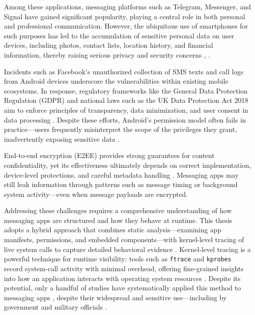\documentclass[a4paper,12pt]{report}
\begin{document}
Among these applications, messaging platforms such as Telegram, Messenger, and Signal have gained significant popularity, playing a
central role in both personal and professional communication. However, the
ubiquitous use of smartphones for such purposes has led to the accumulation of
sensitive personal data on user devices, including photos, contact lists,
location history, and financial information, thereby raising serious privacy and
security concerns \cite{ArsTechnica2018}, \cite{ShenVervierStringhini2021}.

Incidents such as Facebook’s unauthorized collection of SMS texts and call logs
from Android devices \cite{ArsTechnica2018} underscore the vulnerabilities
within existing mobile ecosystems. In response, regulatory frameworks like the
General Data Protection Regulation (GDPR) and national laws such as the UK Data
Protection Act 2018 aim to enforce principles of transparency, data
minimization, and user consent in data processing
\cite{GDPR2016,UKDPA2018}. Despite these efforts, Android’s permission model
often fails in practice—users frequently misinterpret the scope of the
privileges they grant, inadvertently exposing sensitive data \cite{CHI2024Permissions}.

End-to-end encryption (E2EE) provides strong guarantees for content
confidentiality, yet its effectiveness ultimately depends on correct
implementation, device-level protections, and careful metadata handling
\cite{arxiv2020metadata,CohnGordon2017SignalAnalysis,wired2023signalhack}. Messaging apps may still leak
information through patterns such as message timing or background system
activity—even when message payloads are encrypted.

Addressing these challenges requires a comprehensive understanding of how messaging
apps are structured and how they behave at runtime. This thesis adopts a hybrid
approach that combines static analysis—examining app manifests, permissions,
and embedded components—with kernel-level tracing of live system calls to
capture detailed behavioral evidence \cite{BPFroid2021,AOSP2024Ftrace}. Kernel-level tracing is a powerful
technique for runtime visibility: tools such as \texttt{ftrace} \cite{ftrace2023} and \texttt{kprobes} \cite{kprobes2023}
record system-call activity with minimal overhead, offering fine-grained insights
into how an application interacts with operating system resources
. Despite its potential, only a handful of
studies have systematically applied this method to messaging apps
\cite{SLR2025Messaging}, despite their widespread and sensitive use—including
by government and military officials \cite{Politico2025Signal}.
\end{document}

